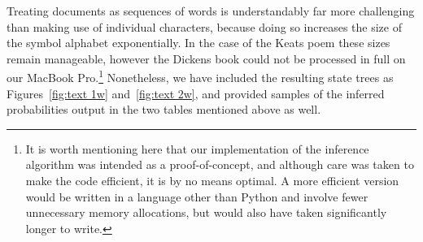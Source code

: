 \documentclass[12pt,a4paper]{article}
\begin{document}
Treating documents as sequences of words is understandably far more challenging
than making use of individual characters, because doing so increases the size of
the symbol alphabet exponentially. In the case of the Keats poem these sizes
remain manageable, however the Dickens book could not be processed in full on
our MacBook Pro.\footnote{It is worth mentioning here that our implementation of
the inference algorithm was intended as a proof-of-concept, and although care
was taken to make the code efficient, it is by no means optimal. A more
efficient version would be written in a language other than Python and involve
fewer unnecessary memory allocations, but would also have taken significantly
longer to write.} Nonetheless, we have included the resulting state trees as
Figures~\ref{fig:text 1w} and~\ref{fig:text 2w}, and provided samples of the
inferred probabilities output in the two tables mentioned above as well.
\end{document}
